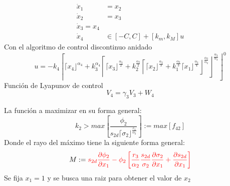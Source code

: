   \begin{equation}
      \begin{split}
      \dot{x}_1&=x_2\\
      \dot{x}_2&=x_3\\
      \dot{x}_3=x_4 \\
      \dot{x}_4& \in [-C,C]+ [k_m, k_M] u
      \end{split}
      \label{inclusion2}
  \end{equation}
  Con el algoritmo de control discontinuo anidado
  \begin{equation}
    u=-k_4 \left\lceil \lceil x_4 \rfloor^{\alpha_4}+ k_3^{\alpha_4} \left\lceil \lceil x_3 \rfloor^{\frac{\alpha_3}{2}}+k_2^{\frac{\alpha_3}{2}}\left\lceil \lceil x_2 \rfloor^{\frac{\alpha_2}{3}}+k_1^{\frac{\alpha_2}{3}} \lceil x_1 \rfloor^{\frac{\alpha_2}{4}}  \right\rfloor^{\frac{\alpha_3}{\alpha_2}} \right\rfloor^\frac{\alpha_3}{\alpha_2}\right\rfloor^0
  \end{equation}
  Función de Lyapunov de control
  \begin{equation}
    V_4=\gamma_3 V_3+W_4
  \end{equation}

  La función a maximizar en su forma general:
  \begin{equation}
  k_2> max \left[ \frac{ \phi_2}{s_{2d} \lceil \sigma_2 \rfloor^{\frac{r_3}{\alpha_2}}} \right]:=max \left[ f_{42} \right]
\end{equation}
Donde el rayo del máximo tiene la siguiente forma general:
\begin{equation*}
  M:=\textcolor{red}{s_{2d} \frac{\partial \phi_2}{\partial x_1}- \phi_2 \left[ \frac{r_3}{\alpha_2} \frac{s_{2d} }{\sigma_2}  \frac{\partial \sigma_2}{\partial x_1} +  \frac{\partial s_{2d}}{\partial x_1}  \right]}
\end{equation*}
Se fija $x_1=1$ y se busca una raiz para obtener el valor de $x_2$

